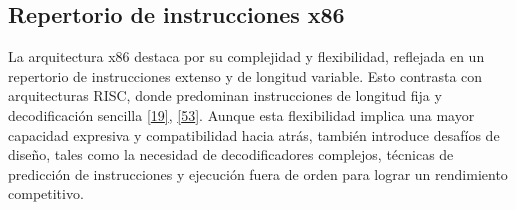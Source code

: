 \documentclass[12pt,oneside]{templates/unerthesis}
\begin{document}
\begin{table}[!h]
\centering
\caption{\label{tab:evolucionx86}Línea de Tiempo de la Evolución de la Arquitectura x86}
\centering
{}
\end{table}

\hypertarget{repertorio-de-instrucciones-x86}{%
\subsection{Repertorio de instrucciones x86}\label{repertorio-de-instrucciones-x86}}

La arquitectura x86 destaca por su complejidad y flexibilidad, reflejada en un repertorio de instrucciones extenso y de longitud variable. Esto contrasta con arquitecturas RISC, donde predominan instrucciones de longitud fija y decodificación sencilla \protect\hyperlink{ref-hennessy2017computer}{{[}19{]}}, \protect\hyperlink{ref-brey_intel_microprocessors}{{[}53{]}}. Aunque esta flexibilidad implica una mayor capacidad expresiva y compatibilidad hacia atrás, también introduce desafíos de diseño, tales como la necesidad de decodificadores complejos, técnicas de predicción de instrucciones y ejecución fuera de orden para lograr un rendimiento competitivo.
\end{document}
